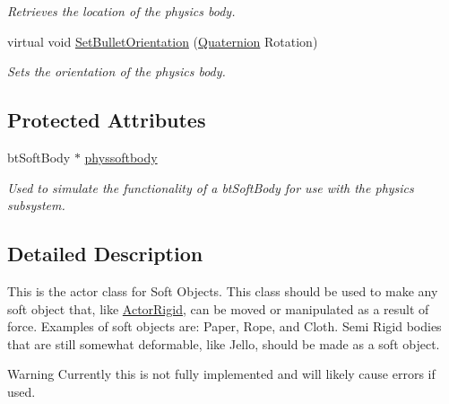 \begin{DoxyCompactItemize}
\begin{DoxyCompactList}\small\item\em Retrieves the location of the physics body. \item\end{DoxyCompactList}\item 
virtual void \hyperlink{classphys_1_1ActorSoft_a4a1119b6e42ff11784673657e7d62c1f}{SetBulletOrientation} (\hyperlink{classphys_1_1Quaternion}{Quaternion} Rotation)
\begin{DoxyCompactList}\small\item\em Sets the orientation of the physics body. \item\end{DoxyCompactList}\end{DoxyCompactItemize}
\subsection*{Protected Attributes}
\begin{DoxyCompactItemize}
\item 
\hypertarget{classphys_1_1ActorSoft_ab3b2c8e1f94dff3e3244a5024595afef}{
btSoftBody $\ast$ \hyperlink{classphys_1_1ActorSoft_ab3b2c8e1f94dff3e3244a5024595afef}{physsoftbody}}
\label{d4/d23/classphys_1_1ActorSoft_ab3b2c8e1f94dff3e3244a5024595afef}

\begin{DoxyCompactList}\small\item\em Used to simulate the functionality of a btSoftBody for use with the physics subsystem. \item\end{DoxyCompactList}\end{DoxyCompactItemize}


\subsection{Detailed Description}
This is the actor class for Soft Objects. This class should be used to make any soft object that, like \hyperlink{classphys_1_1ActorRigid}{ActorRigid}, can be moved or manipulated as a result of force. Examples of soft objects are: Paper, Rope, and Cloth. Semi Rigid bodies that are still somewhat deformable, like Jello, should be made as a soft object. \begin{DoxyWarning}{Warning}
Currently this is not fully implemented and will likely cause errors if used. 
\end{DoxyWarning}


